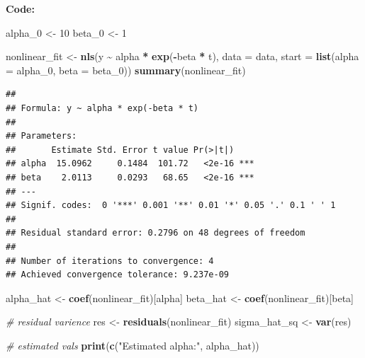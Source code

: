 \documentclass[
]{article}
\newenvironment{Shaded}{\begin{snugshade}}{\end{snugshade}}
\newcommand{\AttributeTok}[1]{\textcolor[rgb]{0.13,0.29,0.53}{#1}}
\newcommand{\CommentTok}[1]{\textcolor[rgb]{0.56,0.35,0.01}{\textit{#1}}}
\newcommand{\DecValTok}[1]{\textcolor[rgb]{0.00,0.00,0.81}{#1}}
\newcommand{\FunctionTok}[1]{\textcolor[rgb]{0.13,0.29,0.53}{\textbf{#1}}}
\newcommand{\NormalTok}[1]{#1}
\newcommand{\OtherTok}[1]{\textcolor[rgb]{0.56,0.35,0.01}{#1}}
\newcommand{\SpecialCharTok}[1]{\textcolor[rgb]{0.81,0.36,0.00}{\textbf{#1}}}
\newcommand{\StringTok}[1]{\textcolor[rgb]{0.31,0.60,0.02}{#1}}
\begin{document}
\textbf{Code:}

\begin{Shaded}
\begin{Highlighting}[]
\NormalTok{alpha\_0 }\OtherTok{\textless{}{-}} \DecValTok{10}
\NormalTok{beta\_0 }\OtherTok{\textless{}{-}} \DecValTok{1}

\NormalTok{nonlinear\_fit }\OtherTok{\textless{}{-}} \FunctionTok{nls}\NormalTok{(y }\SpecialCharTok{\textasciitilde{}}\NormalTok{ alpha }\SpecialCharTok{*} \FunctionTok{exp}\NormalTok{(}\SpecialCharTok{{-}}\NormalTok{beta }\SpecialCharTok{*}\NormalTok{ t), }\AttributeTok{data =}\NormalTok{ data, }
                     \AttributeTok{start =} \FunctionTok{list}\NormalTok{(}\AttributeTok{alpha =}\NormalTok{ alpha\_0, }\AttributeTok{beta =}\NormalTok{ beta\_0))}
\FunctionTok{summary}\NormalTok{(nonlinear\_fit)}
\end{Highlighting}
\end{Shaded}

\begin{verbatim}
## 
## Formula: y ~ alpha * exp(-beta * t)
## 
## Parameters:
##       Estimate Std. Error t value Pr(>|t|)    
## alpha  15.0962     0.1484  101.72   <2e-16 ***
## beta    2.0113     0.0293   68.65   <2e-16 ***
## ---
## Signif. codes:  0 '***' 0.001 '**' 0.01 '*' 0.05 '.' 0.1 ' ' 1
## 
## Residual standard error: 0.2796 on 48 degrees of freedom
## 
## Number of iterations to convergence: 4 
## Achieved convergence tolerance: 9.237e-09
\end{verbatim}

\begin{Shaded}
\begin{Highlighting}[]
\NormalTok{alpha\_hat }\OtherTok{\textless{}{-}} \FunctionTok{coef}\NormalTok{(nonlinear\_fit)[}\StringTok{\textquotesingle{}alpha\textquotesingle{}}\NormalTok{]}
\NormalTok{beta\_hat }\OtherTok{\textless{}{-}} \FunctionTok{coef}\NormalTok{(nonlinear\_fit)[}\StringTok{\textquotesingle{}beta\textquotesingle{}}\NormalTok{]}

\CommentTok{\# residual varience}
\NormalTok{res }\OtherTok{\textless{}{-}} \FunctionTok{residuals}\NormalTok{(nonlinear\_fit)}
\NormalTok{sigma\_hat\_sq }\OtherTok{\textless{}{-}} \FunctionTok{var}\NormalTok{(res)}

\CommentTok{\# estimated vals}
\FunctionTok{print}\NormalTok{(}\FunctionTok{c}\NormalTok{(}\StringTok{"Estimated alpha:"}\NormalTok{, alpha\_hat))}
\end{Highlighting}
\end{Shaded}
\end{document}
